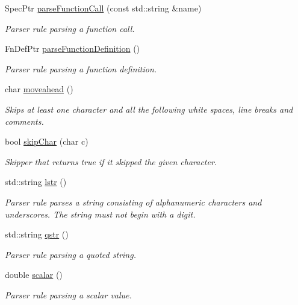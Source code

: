 \begin{DoxyCompactItemize}
Spec\-Ptr \hyperlink{classgiskard__suturo_1_1GiskardPPParser_a422493cb0e62b04443b5a0058e7e65b8}{parse\-Function\-Call} (const std\-::string \&name)
\begin{DoxyCompactList}\small\item\em Parser rule parsing a function call. \end{DoxyCompactList}\item 
Fn\-Def\-Ptr \hyperlink{classgiskard__suturo_1_1GiskardPPParser_ad4c9438a4c33559ec898d76967732b49}{parse\-Function\-Definition} ()
\begin{DoxyCompactList}\small\item\em Parser rule parsing a function definition. \end{DoxyCompactList}\item 
char \hyperlink{classgiskard__suturo_1_1GiskardPPParser_a226b9afa3d4c45dd416acb62dc0e9738}{moveahead} ()
\begin{DoxyCompactList}\small\item\em Skips at least one character and all the following white spaces, line breaks and comments. \end{DoxyCompactList}\item 
bool \hyperlink{classgiskard__suturo_1_1GiskardPPParser_afb006a7326d82ab54d0eeaa72542ba99}{skip\-Char} (char c)
\begin{DoxyCompactList}\small\item\em Skipper that returns true if it skipped the given character. \end{DoxyCompactList}\item 
std\-::string \hyperlink{classgiskard__suturo_1_1GiskardPPParser_a67a1fb5de322d7578db6daf326b18611}{lstr} ()
\begin{DoxyCompactList}\small\item\em Parser rule parses a string consisting of alphanumeric characters and underscores. The string must not begin with a digit. \end{DoxyCompactList}\item 
std\-::string \hyperlink{classgiskard__suturo_1_1GiskardPPParser_a488c72ec868b096a0efaea5c2587e6fd}{qstr} ()
\begin{DoxyCompactList}\small\item\em Parser rule parsing a quoted string. \end{DoxyCompactList}\item 
double \hyperlink{classgiskard__suturo_1_1GiskardPPParser_aa870bd8151cc3e8e39ae130475a86430}{scalar} ()
\begin{DoxyCompactList}\small\item\em Parser rule parsing a scalar value. \end{DoxyCompactList}\item 

\end{DoxyCompactItemize}

